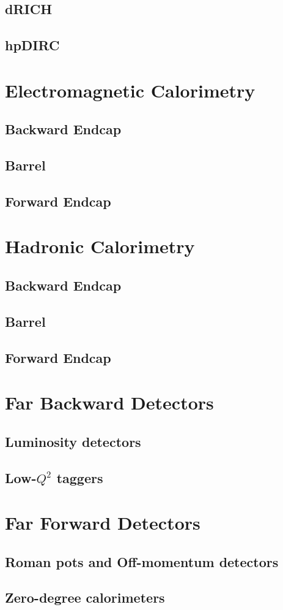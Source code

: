 \subsection{dRICH}
\subsection{hpDIRC}


\section{Electromagnetic Calorimetry}
\subsection{Backward Endcap}
\subsection{Barrel}
\subsection{Forward Endcap}

\section{Hadronic Calorimetry}
\subsection{Backward Endcap}
\subsection{Barrel}
\subsection{Forward Endcap}

\section{Far Backward Detectors}
\subsection{Luminosity detectors}
\subsection{Low-$Q^2$ taggers}

\section{Far Forward Detectors}
\subsection{Roman pots and Off-momentum detectors}
\subsection{Zero-degree calorimeters}

